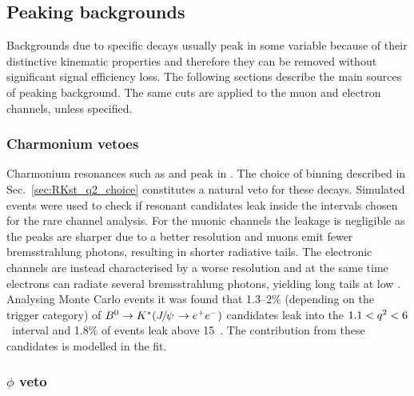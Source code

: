 \subsection{Peaking backgrounds }

Backgrounds due to specific decays usually peak in some variable because of their
distinctive kinematic properties and therefore they can be removed without significant
signal efficiency loss. The following sections describe the main sources of peaking background.
The same cuts are applied to the muon and electron channels, unless specified.

\subsubsection{Charmonium vetoes}

Charmonium resonances such as \jpsi and \psitwos peak in \qsq.
The choice of \qsq binning described in Sec.~\ref{sec:RKst_q2_choice}
constitutes a natural veto for these decays. Simulated events were used
to check if resonant candidates leak inside the \qsq intervals chosen for
the rare channel analysis. For the muonic channels the leakage is negligible
as the peaks are sharper due to a better resolution and muons emit fewer
bremsstrahlung photons, resulting in shorter radiative tails.
The electronic channels are instead  characterised by
a worse resolution and at the same time electrons can radiate 
several bremsstrahlung photons, yielding long tails at low \qsq.
Analysing Monte Carlo events it was found that 1.3--2\% (depending on
the trigger category) of \mbox{$\Bz\to\Kstar(\jpsi\to\ee)$} candidates leak into the 
$1.1 < {q^2} < 6$~\gevgevcccc interval and 1.8\% of \psitwos events leak above 
15~\gevgevcccc. The contribution from these candidates is modelled in the fit. 


\subsubsection{$\phi$ veto}

